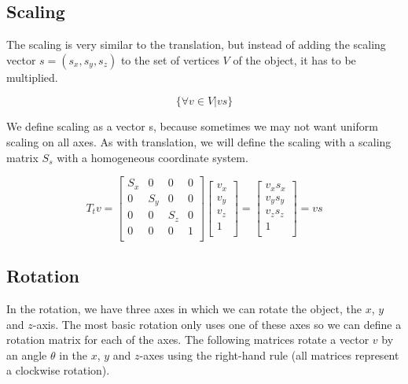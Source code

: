 \documentclass[titlepage,12pt]{report}
\begin{document}
\subsection{Scaling}

The scaling is very similar to the translation, but instead of adding the scaling vector $s = (s_x, s_y, s_z)$ to the set of vertices $V$ of the object, it has to be multiplied.

\begin{equation}
\{\forall v \in V | v s\}
\end{equation}

We define scaling as a vector s, because sometimes we may not want uniform scaling on all axes. As with translation, we will define the scaling with a scaling matrix $S_s$ with a homogeneous coordinate system.

\begin{equation}\label{scaling}
T_t v = 
\begin{bmatrix}
S_x & 0 & 0 & 0 \\
0 & S_y & 0 & 0 \\
0 & 0 & S_z & 0 \\
0 & 0 & 0 & 1 \\
\end{bmatrix}
\begin{bmatrix}
v_x \\
v_y \\
v_z \\
1 \\
\end{bmatrix}
=
\begin{bmatrix}
v_x s_x \\
v_y s_y \\
v_z s_z \\
1 \\
\end{bmatrix}
= v s
\end{equation}

\subsection{Rotation}

In the rotation, we have three axes in which we can rotate the object, the $x$, $y$ and $z$-axis. The most basic rotation only uses one of these axes so we can define a rotation matrix for each of the axes. The following matrices rotate a vector $v$ by an angle $\theta$ in the $x$, $y$ and $z$-axes using the right-hand rule (all matrices represent a clockwise rotation).
\end{document}
